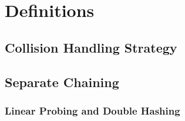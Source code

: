 \section{Definitions}

\subsection{Collision Handling Strategy}
  
  \subsection{Separate Chaining}
  \subsubsection{Linear Probing and Double Hashing}